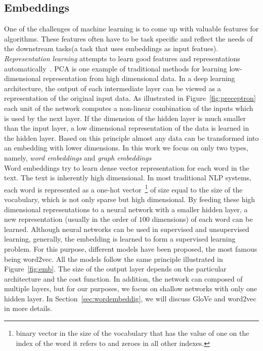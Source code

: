 \subsection{Embeddings}\label{subsec:embeddings}
One of the challenges of machine learning is to come up with valuable features for algorithms. These features often have to be task specific and reflect the needs of the downstream tasks(a task that uses embeddings as input featues). \emph{Representation learning} attempts to learn good features and representations automatically~. PCA is one example of traditional methods for learning low-dimensional representation from high dimensional data. In a deep learning architecture, the output of each intermediate layer can be viewed as a representation of the original input data. As illustrated in Figure~\ref{fig:preceptron} each unit of the network computes a non-linear combination of the inputs which is used by the next layer. If the dimension of the hidden layer is much smaller than the input layer, a low dimensional representation of the data is learned in the hidden layer. Based on this principle almost any data can be transformed into an embedding with lower dimensions. In this work we focus on only two types, namely, \emph{word embeddings} and  \emph{graph embeddings} \\
\noindent
Word embeddings try to learn dense vector representation for each word in the text. The text is inherently high dimensional. In most traditional NLP systems, each word is represented as a one-hot vector~\footnote{binary vector in the size of the vocabulary that has the value of one on the index of the word it refers to and zeroes in all other indexes.} of size equal to the size of the vocabulary, which is not only sparse but high dimensional. By feeding these high dimensional representations to a neural network with a smaller hidden layer, a new representation (usually in the order of $100$ dimensions) of each word can be learned. Although neural networks can be used in supervised and unsupervised learning, generally, the embedding is learned to form a supervised learning problem. For this purpose, different models have been proposed, the most famous being word2vec. All the models follow the same principle illustrated in Figure~\ref{fig:emb}. The size of the output layer depends on the particular architecture and the cost function. In addition, the network can composed of multiple layers, but for our purposes, we focus on shallow networks with only one hidden layer. In Section~\ref{sec:wordembeddig}, we will discuss GloVe and word2vec in more details. \\
